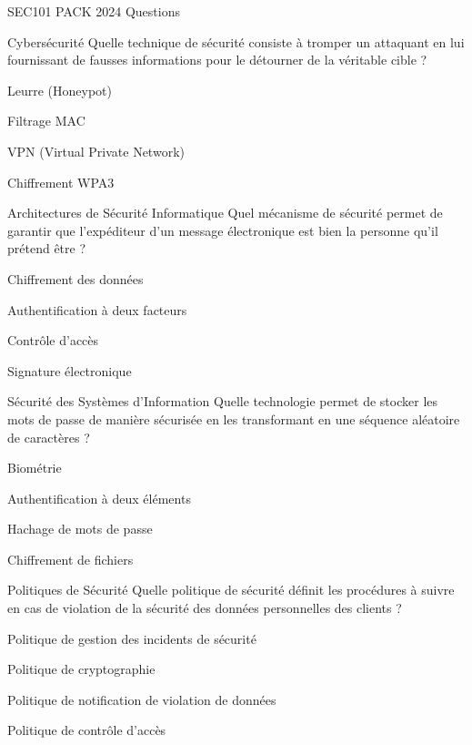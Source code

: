 \documentclass[12pt]{article}
\begin{document}
\begin{quiz}{SEC101 PACK 2024 Questions}
  \begin{multi}[points=1]{Cybersécurité}
    Quelle technique de sécurité consiste à tromper un attaquant en lui fournissant de fausses informations pour le détourner de la véritable cible ?
    \item* Leurre (Honeypot)
    \item Filtrage MAC
    \item VPN (Virtual Private Network)
    \item Chiffrement WPA3
  \end{multi}

  \begin{multi}[points=1]{Architectures de Sécurité Informatique}
    Quel mécanisme de sécurité permet de garantir que l'expéditeur d'un message électronique est bien la personne qu'il prétend être ?
    \item Chiffrement des données
    \item Authentification à deux facteurs
    \item Contrôle d'accès
    \item* Signature électronique
  \end{multi}

  \begin{multi}[points=1]{Sécurité des Systèmes d'Information}
    Quelle technologie permet de stocker les mots de passe de manière sécurisée en les transformant en une séquence aléatoire de caractères ?
    \item Biométrie
    \item Authentification à deux éléments
    \item* Hachage de mots de passe
    \item Chiffrement de fichiers
  \end{multi}

  \begin{multi}[points=1]{Politiques de Sécurité}
    Quelle politique de sécurité définit les procédures à suivre en cas de violation de la sécurité des données personnelles des clients ?
    \item Politique de gestion des incidents de sécurité
    \item Politique de cryptographie
    \item* Politique de notification de violation de données
    \item Politique de contrôle d'accès
  \end{multi}



\end{quiz}
\end{document}
